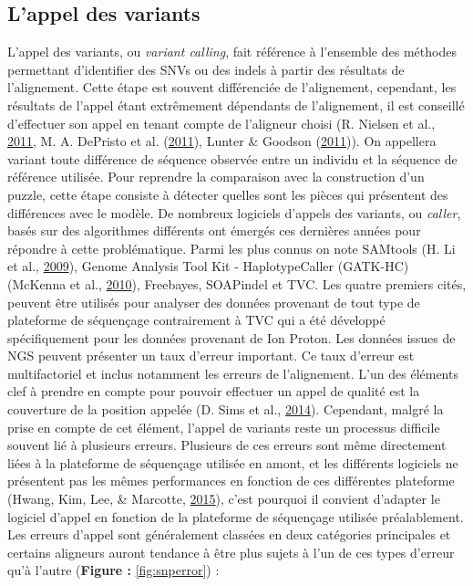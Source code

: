 \documentclass[12pt,twoside]{reedthesis}
\theoremstyle{definition}
\theoremstyle{definition}
\theoremstyle{remark}
\begin{document}
  \subsection{L'appel des variants}\label{lappel-des-variants}
  
  L'appel des variants, ou \emph{variant calling}, fait référence à
  l'ensemble des méthodes permettant d'identifier des SNVs ou des indels à
  partir des résultats de l'alignement. Cette étape est souvent
  différenciée de l'alignement, cependant, les résultats de l'appel étant
  extrêmement dépendants de l'alignement, il est conseillé d'effectuer son
  appel en tenant compte de l'aligneur choisi (R. Nielsen et al.,
  \protect\hyperlink{ref-Nielsen2011}{2011}, M. A. DePristo et al.
  (\protect\hyperlink{ref-DePristo2011}{2011}), Lunter \& Goodson
  (\protect\hyperlink{ref-Lunter2011}{2011})). On appellera variant toute
  différence de séquence observée entre un individu et la séquence de
  référence utilisée. Pour reprendre la comparaison avec la construction
  d'un puzzle, cette étape consiste à détecter quelles sont les pièces qui
  présentent des différences avec le modèle. De nombreux logiciels
  d'appels des variants, ou \emph{caller}, basés sur des algorithmes
  différents ont émergés ces dernières années pour répondre à cette
  problématique. Parmi les plus connus on note SAMtools (H. Li et al.,
  \protect\hyperlink{ref-Li2009}{2009}), Genome Analysis Tool Kit -
  HaplotypeCaller (GATK-HC) (McKenna et al.,
  \protect\hyperlink{ref-McKenna2010}{2010}), Freebayes, SOAPindel et TVC.
  Les quatre premiers cités, peuvent être utilisés pour analyser des
  données provenant de tout type de plateforme de séquençage contrairement
  à TVC qui a été développé spécifiquement pour les données provenant de
  Ion Proton. Les données issues de NGS peuvent présenter un taux d'erreur
  important. Ce taux d'erreur est multifactoriel et inclus notamment les
  erreurs de l'alignement. L'un des éléments clef à prendre en compte pour
  pouvoir effectuer un appel de qualité est la couverture de la position
  appelée (D. Sims et al., \protect\hyperlink{ref-Sims2014}{2014}).
  Cependant, malgré la prise en compte de cet élément, l'appel de variants
  reste un processus difficile souvent lié à plusieurs erreurs. Plusieurs
  de ces erreurs sont même directement liées à la plateforme de séquençage
  utilisée en amont, et les différents logiciels ne présentent pas les
  mêmes performances en fonction de ces différentes plateforme (Hwang,
  Kim, Lee, \& Marcotte, \protect\hyperlink{ref-Hwang2015}{2015}), c'est
  pourquoi il convient d'adapter le logiciel d'appel en fonction de la
  plateforme de séquençage utilisée préalablement. Les erreurs d'appel
  sont généralement classées en deux catégories principales et certains
  aligneurs auront tendance à être plus sujets à l'un de ces types
  d'erreur qu'à l'autre (\textbf{Figure : }\ref{fig:snperror}) :
  
\end{document}
